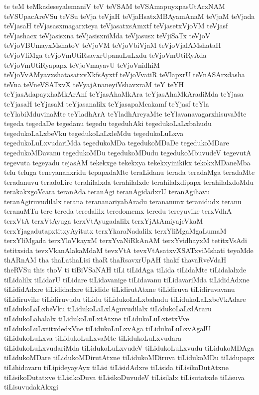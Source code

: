 {te
teM
teMkadeseyalemaniV
teV
teVSAM
teVSAmapuyxpasUtArxNAM
teVSUpacAreVSu
teVSu
teVja
teVjaH
teVjaHsatxMBAyamAnaM
teVjaM
teVjada
teVjasaH
teVjasasxmagarxteya
teVjasatxsAmxtf
teVjasetxVjoVM
teVjasf
teVjashacx
teVjasisxna
teVjasisxniMda
teVjasusx
teVjiSaTx
teVjoV
teVjoVBUmayxMshatoV
teVjoVM
teVjoVbiVjaM
teVjoVjalAMshataH
teVjoVliMga
teVjoVmUtiRsavxrUpanuLuLxdu
teVjoVmUtiRyAda
teVjoVmUtiRyapapx
teVjoVmayavU
teVjoVnidhiM
teVjoVvAMyavxshatasatxvXkfsAyxtf
teVjoVvatiR
teVlapxrU
teVnASArxdasha
teVna
teVneVSATxvX
teVyajAnaneyiVshavxraM
teY
teYH
teYjasAdapayxhaMkArAnf
teYjasAhaMkAra
teYjasAhaMkAradiMda
teYjasa
teYjasaH
teYjasaM
teYjasanalilx
teYjasapaMcakamf
teYjasf
teYla
teYlabiMduvinaMte
teYladhArA
teYladhAreyaMte
teYlavanavagarxhisuvaMte
tegeda
tegedaDe
tegedanu
tegedu
tegeduhAki
tegedukoLaLxbahudu
tegedukoLaLxbeVku
tegedukoLaLxleMdu
tegedukoLuLxva
tegedukoLuLxvudariMda
tegedukoMDa
tegedukoMDaDe
tegedukoMDare
tegedukoMDavanu
tegedukoMDu
tegedukoMDudu
tegedukoMbuvudeV
tegevutA
tegevuta
tegeyadu
tejasAM
tekekxge
tekekxya
tekekxyinikikx
tekokxMDaneMba
telu
teluga
teneyananxridu
tepapxdaMte
teraLidanu
terada
teradaMga
teradaMte
teradanuvu
teradoLire
terahilalxda
terahilalxde
terahilalxdipapx
terahilalxdoMdu
terakakxgoVcara
teranAda
teranAgi
teranAgidadxrU
teranAgihavu
teranAgiruvudilalx
terana
terananariyabAradu
terananunx
teranidudx
teranu
teranuMTu
tere
tereda
teredalilx
teredomemx
teredu
tereyuvike
terxVdhA
terxVtA
terxVtAyuga
terxVtAyugadalilx
terxYjAtAmiyajeVkaM
terxYjagadutapxtitxyAyitutx
terxYkaraNadalilx
terxYliMgaMgaLumaM
terxYliMgada
terxYloVkayxM
terxYvaNiRkAnAM
terxYvidhayxM
tetitxVsAdi
tetitxsida
tevxVkanAlakaMdaM
tevxVtA
tevxVtAsatxvXSATxviMshati
teyoMde
thARnAM
tha
thaLathaLisi
thaR
thaRsavxrUpAH
thakf
thavaRveVdaH
theRVSu
this
thoV
ti
tiBiVSaNAH
tiLi
tiLidAga
tiLida
tiLidaMte
tiLidalalxde
tiLidalilx
tiLidarU
tiLidare
tiLidavanige
tiLidavanu
tiLidavariMda
tiLididAdxne
tiLididAdxre
tiLididadxre
tiLidide
tiLidirutAtxne
tiLidiruva
tiLidiruvavanu
tiLidiruvike
tiLidiruvudu
tiLidu
tiLidukoLaLxbahudu
tiLidukoLaLxbeVkAdare
tiLidukoLaLxbeVku
tiLidukoLaLxlAguvudilalx
tiLidukoLaLxlAraru
tiLidukoLabalalx
tiLidukoLuLxtAtxne
tiLidukoLuLxtetxVve
tiLidukoLuLxtitxdedxVne
tiLidukoLuLxvAga
tiLidukoLuLxvAgalU
tiLidukoLuLxva
tiLidukoLuLxvaMte
tiLidukoLuLxvudara
tiLidukoLuLxvudariMda
tiLidukoLuLxvudeV
tiLidukoLuLxvudu
tiLidukoMDAga
tiLidukoMDare
tiLidukoMDirutAtxne
tiLidukoMDiruva
tiLidukoMDu
tiLidupapx
tiLihidavaru
tiLipideyayAyx
tiLisi
tiLisidAdxre
tiLisida
tiLisikoDutAtxne
tiLisikoDutatxve
tiLisikoDuva
tiLisikoDuvudeV
tiLisilalx
tiLisutatxde
tiLisuva
tiLisuvudakAkxgi
}
